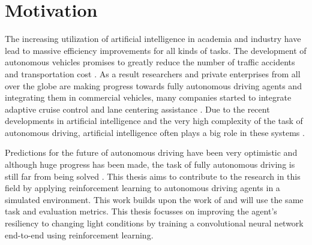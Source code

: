 \chapter{Motivation}
\label{cha:Motivation}

The increasing utilization of artificial intelligence in academia and industry have lead to massive efficiency improvements for all kinds of tasks. The development of autonomous vehicles promises to greatly reduce the number of traffic accidents and transportation cost \autocite{mckinsey}. As a result researchers and private enterprises from all over the globe are making progress towards fully autonomous driving agents and integrating them in commercial vehicles, many companies started to integrate adaptive cruise control and lane centering assistance \autocite{carreviews}. Due to the recent developments in artificial intelligence and the very high complexity of the task of autonomous driving, artificial intelligence often plays a big role in these systems \autocite{teslaEndToEnd}.


Predictions for the future of autonomous driving have been very optimistic and although huge progress has been made, the task of fully autonomous driving is still far from being solved \autocite{state_of_autonomous_driving2023}. This thesis aims to contribute to the research in this field by applying reinforcement learning to autonomous driving agents in a simulated environment. This work builds upon the work of \autocite{maximilian} and will use the same task and evaluation metrics. This thesis focusses on improving the agent's resiliency to changing light conditions by training a convolutional neural network end-to-end using reinforcement learning.

